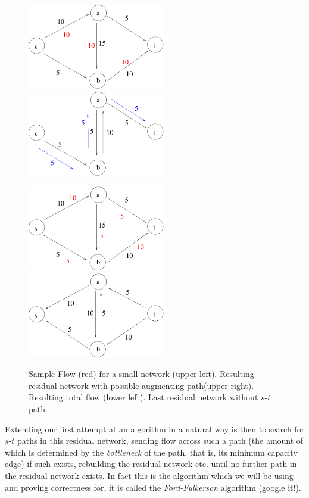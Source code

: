 \documentclass{article}
\begin{document}
\begin{figure}
\begin{center}
\includegraphics[width=6cm]{Figs/flow1.pdf} 
\hspace{1cm}
\includegraphics[width=6cm]{Figs/flowRN1.pdf}

\vspace{1cm}
\includegraphics[width=6cm]{Figs/flowRN2.pdf}
\hspace{1cm}
\includegraphics[width=6cm]{Figs/flowRN3.pdf}
\end{center}
\caption{Sample Flow (red) for a small network (upper left). Resulting residual network with possible augmenting path(upper right). Resulting total flow (lower left). Last residual network without $s$-$t$ path.}\label{fig:flowRN}
\end{figure}

Extending our first attempt at an algorithm in a natural way is then to search for $s$-$t$ paths in this residual network, sending flow across such a path (the amount of which is determined by the \emph{bottleneck} of the path, that is, its minimum capacity edge) if such exists, rebuilding the residual network etc. until no further path in the residual network exists. In fact this is the algorithm which we will be using and proving correctness for, it is called the \emph{Ford-Fulkerson} algorithm (google it!).	
\end{document}
